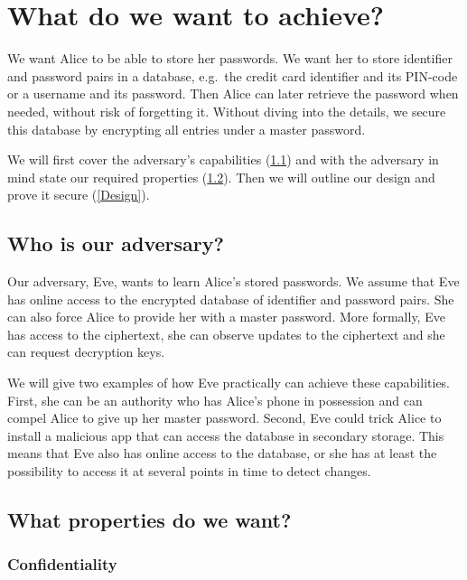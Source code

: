 \section{What do we want to achieve?}

We want Alice to be able to store her passwords.
We want her to store identifier and password pairs in a database, e.g.\ the 
credit card identifier and its PIN-code or a username and its password.
Then Alice can later retrieve the password when needed, without risk of 
forgetting it.
Without diving into the details, we secure this database by encrypting all 
entries under a master password.

We will first cover the adversary's capabilities (\cref{AdversaryModel}) and 
with the adversary in mind state our required properties 
(\cref{RequiredProperties}).
Then we will outline our design and prove it secure (\cref{Design}).

\subsection{Who is our adversary?}
\label{AdversaryModel}

Our adversary, Eve, wants to learn Alice's stored passwords.
We assume that Eve has online access to the encrypted database of identifier 
and password pairs.
She can also force Alice to provide her with a master password.
More formally, Eve has access to the ciphertext, she can observe updates to the
ciphertext and she can request decryption keys.

We will give two examples of how Eve practically can achieve these 
capabilities.
First, she can be an authority who has Alice's phone in possession and can 
compel Alice to give up her master password.
Second, Eve could trick Alice to install a malicious app that can access the 
database in secondary storage.
This means that Eve also has online access to the database, or she has at least
the possibility to access it at several points in time to detect changes.

\subsection{What properties do we want?}
\label{RequiredProperties}

\subsubsection{Confidentiality}

